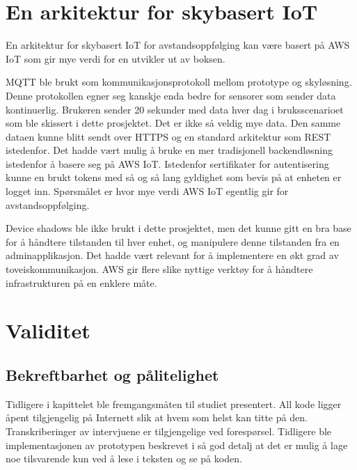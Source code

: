 \section{En arkitektur for skybasert IoT}
En arkitektur for skybasert IoT for avstandsoppfølging kan være basert på AWS IoT som gir mye verdi for en utvikler ut av boksen.

MQTT ble brukt som kommunikasjonsprotokoll mellom prototype og skyløsning. Denne protokollen egner seg kanskje enda bedre for sensorer
som sender data kontinuerlig. Brukeren sender 20 sekunder med data hver dag i bruksscenarioet som ble skissert i dette prosjektet. Det er ikke så veldig
mye data. Den samme dataen kunne blitt sendt over HTTPS og en standard arkitektur som REST istedenfor. Det hadde vært mulig å bruke
en mer tradisjonell backendløsning istedenfor å basere seg på AWS IoT. Istedenfor sertifikater for autentisering
kunne en brukt tokens med så og så lang gyldighet som bevis på at enheten er logget inn. Spørsmålet er hvor mye verdi AWS IoT egentlig gir
for avstandsoppfølging.

Device shadows ble ikke brukt i dette prosjektet, men det kunne gitt en bra base for å håndtere tilstanden til hver enhet, og manipulere denne tilstanden
fra en adminapplikasjon. Det hadde vært relevant for å implementere en økt grad av toveiskommunikasjon. AWS gir flere slike nyttige verktøy for
å håndtere infrastrukturen på en enklere måte.
\fi

\section{Validitet} %
\label{sec:validitet}

\subsection{Bekreftbarhet og pålitelighet}
Tidligere i kapittelet ble fremgangsmåten til studiet presentert. All kode ligger åpent tilgjengelig på Internett slik at hvem som helst kan
titte på den. Transkriberinger av intervjuene er tilgjengelige ved forespørsel. Tidligere ble implementasjonen av prototypen beskrevet i
så god detalj at det er mulig å lage noe tilsvarende kun ved å lese i teksten og se på koden.

